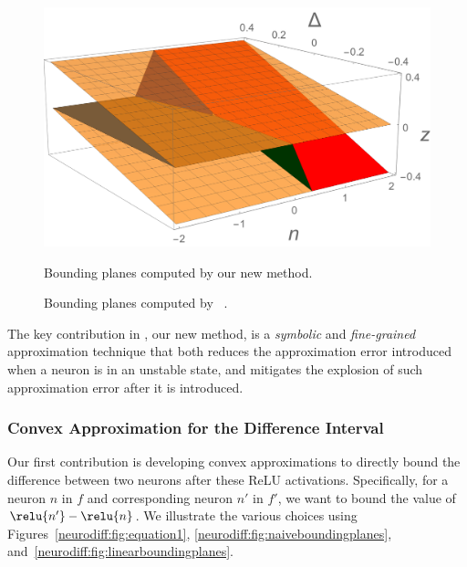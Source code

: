 \begin{figure}
\begin{minipage}[t]{0.45\linewidth}
\centering
\includegraphics[width=\linewidth]{neurodiff/figs/linearboundingplanes.png}
\caption{Bounding planes computed by our new method.}
\label{neurodiff:fig:linearboundingplanes}
\end{minipage}%
%
\hspace{0.09\linewidth}
%
\begin{minipage}[t]{0.45\linewidth}
\centering
\scalebox{.65}{}
\caption{Bounding planes computed by \Neurify{}~\cite{WangPWYJ18nips}.}
\label{neurodiff:fig:wangconvex}
\end{minipage}
\end{figure}


The key contribution in \Name{}, our new method, is a \emph{symbolic}
and \emph{fine-grained} approximation technique that both reduces the
approximation error introduced when a neuron is in an unstable state,
and mitigates the explosion of such approximation error after it is
introduced.


\subsubsection{Convex Approximation for the Difference Interval}

Our first contribution is developing convex approximations to directly
bound the difference between two neurons after these ReLU activations.
Specifically, for a neuron $ n $ in $ f $ and corresponding neuron $
n' $ in $ f' $, we want to bound the value of $ \relu{n'} - \relu{n}
$. We illustrate the various choices using
Figures~\ref{neurodiff:fig:equation1}, \ref{neurodiff:fig:naiveboundingplanes},
and~\ref{neurodiff:fig:linearboundingplanes}.


